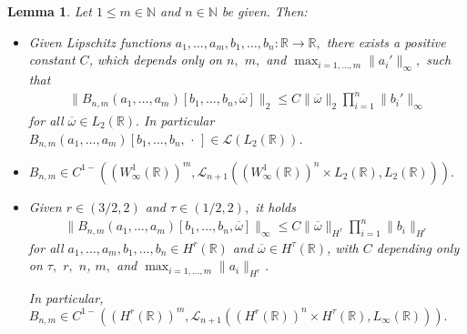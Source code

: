 \documentclass[11pt,reqno]{amsart}
\numberwithin{equation}{section}
\newcommand{\0}{\Omega}
\newcommand{\ov}{\overline}
\newcommand{\oo}{\ov\omega}
\newcommand{\kL}{\mathcal{L}}
\newcommand{\R}{\mathbb{R}}
\newcommand{\N}{\mathbb{N}}
\newtheorem{lemma}[thm]{Lemma}
\numberwithin{equation}{section}
\begin{document}
 \begin{lemma}\label{L:99a}
 Let $1\leq m\in\N$ and  $n\in\N$ be given.  Then: 
 \begin{itemize}
  \item[$(i)$] Given Lipschitz functions $a_1,\ldots, a_{m},b_1,\ldots, b_n:\R\to\R,$ there exists  a positive constant  $C$,
  which depends only on $n,$ $m,$ and $\max_{i=1,\ldots, m}\|a_i'\|_\infty,$ such that 
\begin{align*}
 \|B_{n,m}(a_1,\ldots, a_{m})[b_1,\ldots, b_n,\oo]\|_2\leq C\|\oo\|_2\prod_{i=1}^{n} \|b_i'\|_\infty 
\end{align*}
for all $\oo\in L_2(\R).$
In particular $B_{n,m}(a_1,\ldots, a_{m})[b_1,\ldots, b_n,\,\cdot\,]\in \kL(  L_2(\R))$.

  \item[$(ii)$]  $B_{n,m}\in C^{1-}((W^1_\infty(\R))^{m},\kL_{n+1}((W^1_\infty(\R))^{n}\times L_2(\R),L_2(\R))).$   
   \item[$(iii)$]   Given $r\in (3/2,2)$ and $\tau\in(1/2,2),$  it holds
   \begin{align*}   
 \|B_{n,m}(a_1,\ldots, a_{m})[b_1,\ldots, b_n,\oo]\|_\infty\leq C\|\oo\|_{H^\tau} \prod_{i=1}^{n} \|b_i\|_{H^r} 
\end{align*}
  for all $a_1,\ldots, a_{m}, b_1,\ldots, b_n\in H^r(\R)$ and $\oo\in H^\tau(\R)$,  with $C$ depending only on $\tau,$ $ r,$ $n $, $m,$ and  $\max_{i=1,\ldots, m}\|a_i \|_{H^r}$.
  
 In particular,   $B_{n,m}\in C^{1-}((H^r(\R))^{m},\kL_{n+1}((H^r(\R))^{n}\times H^\tau(\R),L_\infty(\R))).$ 
 \end{itemize}  
 \end{lemma}
\end{document}
